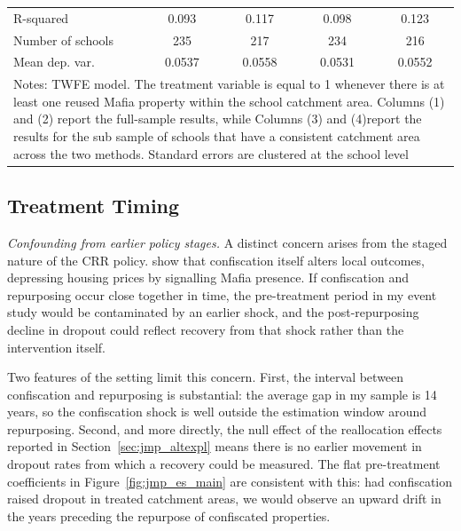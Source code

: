 \documentclass[12pt]{article}
\theoremstyle{plain}
\theoremstyle{plain}
\theoremstyle{plain}
\theoremstyle{definition}
\theoremstyle{plain}
\theoremstyle{definition}
\theoremstyle{plain}
\theoremstyle{remark}
\theoremstyle{definition}
\theoremstyle{definition}
\theoremstyle{plain}
\begin{document}
\begin{table}[H]
{\begin{tabular}{p{12.39em}llll}
			\multicolumn{1}{l}{R-squared} & \multicolumn{1}{c}{0.093} & \multicolumn{1}{c}{0.117} & \multicolumn{1}{c}{0.098} & \multicolumn{1}{c}{0.123} \\
			\multicolumn{1}{l}{Number of schools} & \multicolumn{1}{c}{235} & \multicolumn{1}{c}{217} & \multicolumn{1}{c}{234} & \multicolumn{1}{c}{216} \\
			\multicolumn{1}{l}{Mean dep. var.} & \multicolumn{1}{c}{0.0537} & \multicolumn{1}{c}{0.0558} & \multicolumn{1}{c}{0.0531} & \multicolumn{1}{c}{0.0552} \\
			\midrule
			\multicolumn{5}{p{45.385em}}{Notes: TWFE model. The treatment variable is equal to 1 whenever there is at least one reused Mafia property within the school catchment area. Columns (1) and (2) report the full-sample results, while Columns (3) and (4)report the results for the sub sample of schools that have a consistent catchment area across the two methods. Standard errors are clustered at the school level} \\
		\end{tabular}%
	}
\end{table}

\FloatBarrier
\subsection{Treatment Timing}
\label{sec:jmp_treattiming}
\emph{Confounding from earlier policy stages.} A distinct concern arises from the staged nature of the CRR policy. \citet{boeri_localized_2023} show that confiscation itself alters local outcomes, depressing housing prices by signalling Mafia presence. If confiscation and repurposing occur close together in time, the pre-treatment period in my event study would be contaminated by an earlier shock, and the post-repurposing decline in dropout could reflect recovery from that shock rather than the intervention itself.

Two features of the setting limit this concern. First, the interval between confiscation and repurposing is substantial: the average gap in my sample is 14 years, so the confiscation shock is well outside the estimation window around repurposing. Second, and more directly, the null effect of the reallocation effects reported in Section~\ref{sec:jmp_altexpl} means there is no earlier movement in dropout rates from which a recovery could be measured. The flat pre-treatment coefficients in Figure~\ref{fig:jmp_es_main} are consistent with this: had confiscation raised dropout in treated catchment areas, we would observe an upward drift in the years preceding the repurpose of confiscated properties.
\end{document}
